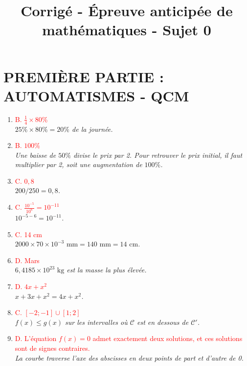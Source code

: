 \documentclass[11pt,a4paper]{article}
\title{Corrigé - Épreuve anticipée de mathématiques - Sujet 0}
\author{}
\date{}
\newcommand{\reponse}[1]{\textcolor{red}{#1}}
\begin{document}
\maketitle

\section*{PREMIÈRE PARTIE : AUTOMATISMES - QCM}

\begin{enumerate}
    \item \reponse{B. $\frac{1}{4} \times 80\%$} \\
    \textit{$25\% \times 80\% = 20\%$ de la journée.}

    \item \reponse{B. $100\%$} \\
    \textit{Une baisse de $50\%$ divise le prix par 2. Pour retrouver le prix initial, il faut multiplier par 2, soit une augmentation de $100\%$.}

    \item \reponse{C. $0,8$} \\
    \textit{$200/250 = 0,8$.}

    \item \reponse{C. $\frac{10^{-5}}{10^{6}} = 10^{-11}$} \\
    \textit{$10^{-5-6} = 10^{-11}$.}

    \item \reponse{C. 14 cm} \\
    \textit{$2000 \times 70 \times 10^{-3} \text{ mm} = 140 \text{ mm} = 14 \text{ cm}$.}

    \item \reponse{D. Mars} \\
    \textit{$6,4185 \times 10^{23} \text{ kg}$ est la masse la plus élevée.}

    \item \reponse{D. $4x + x^2$} \\
    \textit{$x + 3x + x^2 = 4x + x^2$.}

    \item \reponse{C. $[-2; -1] \cup [1; 2]$} \\
    \textit{$f(x) \leq g(x)$ sur les intervalles où $\mathcal{C}$ est en dessous de $\mathcal{C}'$.}

    \item \reponse{D. L'équation $f(x) = 0$ admet exactement deux solutions, et ces solutions sont de signes contraires.} \\
    \textit{La courbe traverse l'axe des abscisses en deux points de part et d'autre de 0.}


\end{enumerate}
\end{document}
